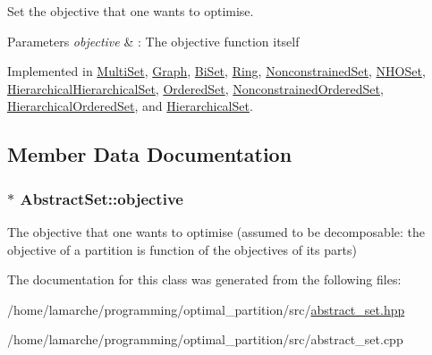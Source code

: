 Set the objective that one wants to optimise. 


\begin{DoxyParams}{Parameters}
{\em objective} & \-: The objective function itself \\
\hline
\end{DoxyParams}


Implemented in \hyperlink{classMultiSet_a0c7e6fb6d2eb064cf6bf2fe7e810726a}{Multi\-Set}, \hyperlink{classGraph_a294aff8b11a1b11dae2b4cd39b78b91d}{Graph}, \hyperlink{classBiSet_aa81de5cee7bae0c86493b31ceb5199b8}{Bi\-Set}, \hyperlink{classRing_af9bc7f0b325cbd2b6284aadeacdee6fb}{Ring}, \hyperlink{classNonconstrainedSet_a2d2b1ff5390c9c8bfa7e6e361ea1ddb1}{Nonconstrained\-Set}, \hyperlink{classNHOSet_ac1e59897d3af9dd6c019d6db9bb74dd1}{N\-H\-O\-Set}, \hyperlink{classHierarchicalHierarchicalSet_ae47e3171479131c47a2252b5c054ceef}{Hierarchical\-Hierarchical\-Set}, \hyperlink{classOrderedSet_a6051e561b7b5fcd1dc5ee8f9f67353fe}{Ordered\-Set}, \hyperlink{classNonconstrainedOrderedSet_a67a4a72a5e1bff3d46473757199455d9}{Nonconstrained\-Ordered\-Set}, \hyperlink{classHierarchicalOrderedSet_a813f90e2aff889461b9e089b7ff460bc}{Hierarchical\-Ordered\-Set}, and \hyperlink{classHierarchicalSet_aa555c69a5761820567bfe391969859d3}{Hierarchical\-Set}.



\subsection{Member Data Documentation}
\hypertarget{classAbstractSet_a0217447a042827703e1ea7655f0fc099}{
\subsubsection[{objective}]{$\ast$ Abstract\-Set\-::objective}}\label{classAbstractSet_a0217447a042827703e1ea7655f0fc099}
The objective that one wants to optimise (assumed to be decomposable\-: the objective of a partition is function of the objectives of its parts) 

The documentation for this class was generated from the following files\-:\begin{DoxyCompactItemize}
\item 
/home/lamarche/programming/optimal\-\_\-partition/src/\hyperlink{abstract__set_8hpp}{abstract\-\_\-set.\-hpp}\item 
/home/lamarche/programming/optimal\-\_\-partition/src/abstract\-\_\-set.\-cpp\end{DoxyCompactItemize}
